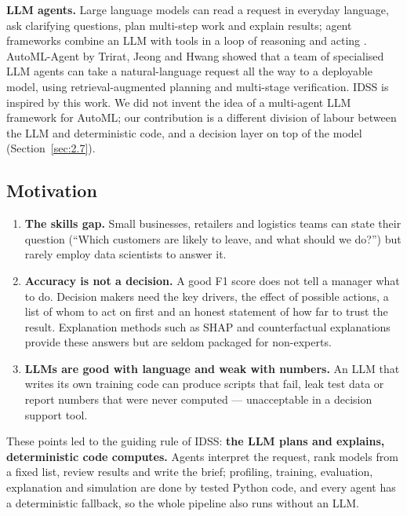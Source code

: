 \textbf{LLM agents.} Large language models can read a request in everyday language, ask clarifying questions, plan multi-step work and explain results; agent frameworks combine an LLM with tools in a loop of reasoning and acting \cite{ref8}. AutoML-Agent by Trirat, Jeong and Hwang \cite{ref9} showed that a team of specialised LLM agents can take a natural-language request all the way to a deployable model, using retrieval-augmented planning and multi-stage verification. IDSS is inspired by this work. We did not invent the idea of a multi-agent LLM framework for AutoML; our contribution is a different division of labour between the LLM and deterministic code, and a decision layer on top of the model (Section~\ref{sec:2.7}).

\subsection{Motivation}\label{sec:1.1.2}

\begin{enumerate}
  \item \textbf{The skills gap.} Small businesses, retailers and logistics teams can state their question (``Which customers are likely to leave, and what should we do?'') but rarely employ data scientists to answer it.
  \item \textbf{Accuracy is not a decision.} A good F1 score does not tell a manager what to do. Decision makers need the key drivers, the effect of possible actions, a list of whom to act on first and an honest statement of how far to trust the result. Explanation methods such as SHAP \cite{ref10} and counterfactual explanations \cite{ref11} provide these answers but are seldom packaged for non-experts.
  \item \textbf{LLMs are good with language and weak with numbers.} An LLM that writes its own training code can produce scripts that fail, leak test data or report numbers that were never computed --- unacceptable in a decision support tool.
\end{enumerate}

These points led to the guiding rule of IDSS: \textbf{the LLM plans and explains, deterministic code computes.} Agents interpret the request, rank models from a fixed list, review results and write the brief; profiling, training, evaluation, explanation and simulation are done by tested Python code, and every agent has a deterministic fallback, so the whole pipeline also runs without an LLM.

\FloatBarrier
